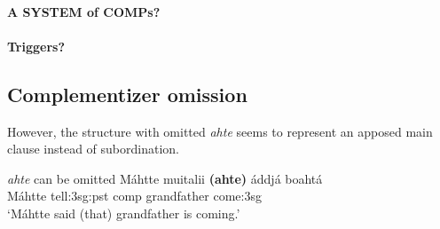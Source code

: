 \documentclass[a4,12pt]{scrartcl}
\begin{document}
\paragraph{A SYSTEM of COMPs?}

\paragraph{Triggers?}


\subsection{Complementizer omission}
However, the structure with omitted {\it ahte} seems to represent an apposed main clause instead of subordination.

\begin{exe}
	\ex \label{ahteOmitted} {\it ahte} can be omitted \citep[439]{nickel1994}%
	\gll 	Máhtte 	muitalii 	{\bf (ahte)} 	áddjá 	boahtá \\
 	Máhtte 	tell:{\sc 3sg:pst} {\sc comp} grandfather come:{\sc 3sg}\\
	\glt ‘Máhtte said (that) grandfather is coming.’
 \end{exe}

%
\end{document}
